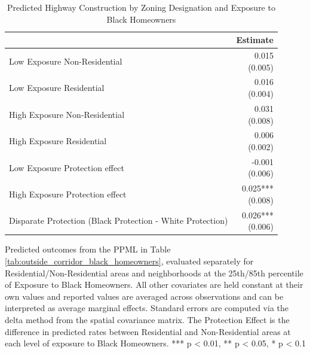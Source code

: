 \begin{table}[h]
\centering
\caption{Predicted Highway Construction by Zoning Designation and Exposure to Black Homeowners}
\label{tab:predicted_outcomes_black_homeowners}
\begin{threeparttable}
\begin{tabular*}{0.6\textwidth}{@{\extracolsep{\fill}}l*{1}{r}}
\toprule
 & Estimate \\
\midrule
Low Exposure Non-Residential & \makecell[tr]{0.015 \\ (0.005)} \\
Low Exposure Residential & \makecell[tr]{0.016 \\ (0.004)} \\
High Exposure Non-Residential & \makecell[tr]{0.031 \\ (0.008)} \\
High Exposure Residential & \makecell[tr]{0.006 \\ (0.002)} \\
Low Exposure Protection effect & \makecell[tr]{-0.001 \\ (0.006)} \\
High Exposure Protection effect & \makecell[tr]{0.025{***} \\ (0.008)} \\
Disparate Protection (Black Protection - White Protection) & \makecell[tr]{0.026{***} \\ (0.006)} \\
\bottomrule
\end{tabular*}
\begin{tablenotes}[flushleft]
\footnotesize
\item Predicted outcomes from the PPML in Table \ref{tab:outside_corridor_black_homeowners}, evaluated separately for Residential/Non-Residential areas and neighborhoods at the 25th/85th percentile of Exposure to Black Homeowners. All other covariates are held constant at their own values and reported values are averaged across observations and can be interpreted as average marginal effects. Standard errors are computed via the delta method from the spatial covariance matrix. The Protection Effect is the difference in predicted rates between Residential and Non-Residential areas at each level of exposure to Black Homeowners. *** p < 0.01, ** p < 0.05, * p < 0.1
\end{tablenotes}
\end{threeparttable}
\end{table}
